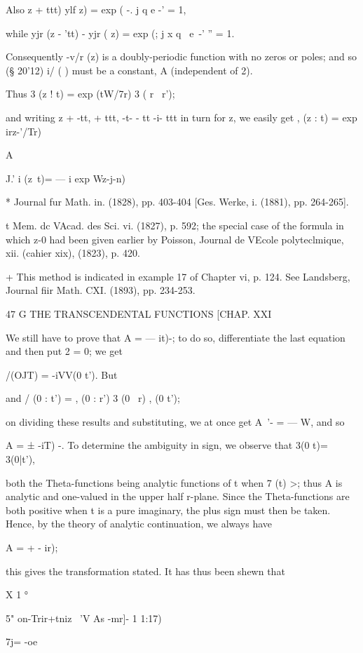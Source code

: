 Also z + ttt) ylf z) = exp ( -. j q e -' = 1,

while yjr (z - 'tt) - yjr ( z) = exp (; j x q~ e~-' '' = 1.

Consequently -v/r (z) is a doubly-periodic function with no zeros or
poles; and so (§ 20'12) i/ ( ) must be a constant, A (independent of
2).

Thus 3 (z ! t) = exp (tW/7r) 3 ( r \ r');

and writing z + -tt, + ttt, -t- - tt -i- ttt in turn for z, we easily
get , (z : t) = exp irz-'/Tr) %

A%

J.' i (z\ t)= — i exp Wz-j-n) %

* Journal fur Math. in. (1828), pp. 403-404 [Ges. Werke, i. (1881),
pp. 264-265].

t Mem. dc VAcad. des Sci. vi. (1827), p. 592; the special case of the
formula in which z-0 had been given earlier by Poisson, Journal de
VEcole polyteclmique, xii. (cahier xix), (1823), p. 420.

+ This method is indicated in example 17 of Chapter vi, p. 124. See
Landsberg, Journal fiir Math. CXI. (1893), pp. 234-253.

47 G THE TRANSCENDENTAL FUNCTIONS [CHAP. XXI

We still have to prove that A = — it)-; to do so, differentiate the
last equation and then put 2 = 0; we get

 /(OJT) = -iVV(0 t'). But %

and / (0 : t') = , (0 : r') 3 (0 \ r) , (0 t');

on dividing these results and substituting, we at once get A~'- = — W,
and so

A = ± -iT) -. To determine the ambiguity in sign, we observe that 3(0
t)= 3(0|t'),

both the Theta-functions being analytic functions of t when 7 (t) >;
thus A is analytic and one-valued in the upper half r-plane. Since the
Theta-functions are both positive when t is a pure imaginary, the plus
sign must then be taken. Hence, by the theory of analytic
continuation, we always have

A = + - ir);

this gives the transformation stated. It has thus been shewn that

X 1 °

5" on-Trir+tniz \ 'V As -mr]- 1 1:17)

7j= -oe


